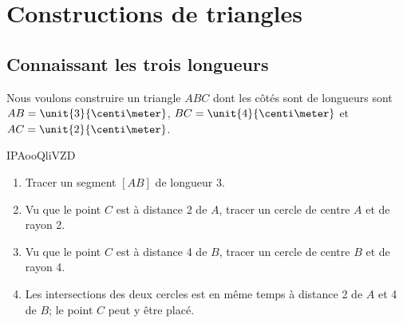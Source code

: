 


\section{Constructions de triangles}

\subsection{Connaissant les trois longueurs}

Nous voulons construire un triangle \(ABC\) dont les côtés sont de longueurs sont \( AB=\unit{3}{\centi\meter}\), \( BC=\unit{4}{\centi\meter}\) et \( AC=\unit{2}{\centi\meter}\).


IPAooQliVZD

\begin{enumerate}
    \item
        Tracer un segment \( [AB]\) de longueur \unit{3}{\centi\meter}.
    \item
        Vu que le point \( C\) est à distance \unit{2}{\centi\meter} de \( A\), tracer un cercle de centre \( A\) et de rayon \unit{2}{\centi\meter}.
    \item
        Vu que le point \( C\) est à distance \unit{4}{\centi\meter} de \( B\), tracer un cercle de centre \( B\) et de rayon \unit{4}{\centi\meter}.
    \item
        Les intersections des deux cercles est en même temps à distance \unit{2}{\centi\meter} de \( A\) et \unit{4}{\centi\meter} de \( B\); le point \( C\) peut y être placé.
\end{enumerate}


